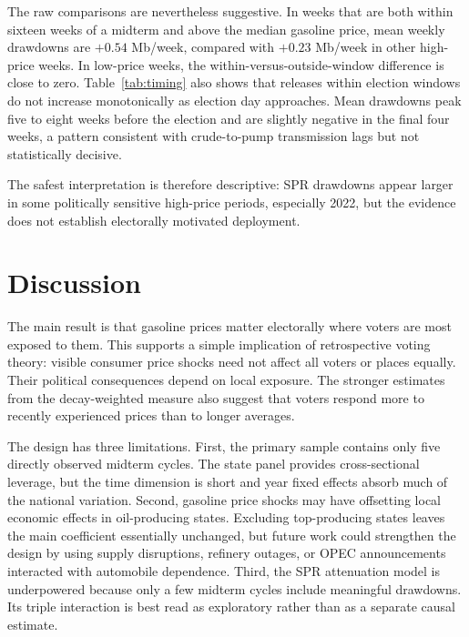 \documentclass[12pt]{article}
\begin{document}
The raw comparisons are nevertheless suggestive. In weeks that are both within sixteen weeks of a midterm and above the median gasoline price, mean weekly drawdowns are $+0.54$ Mb/week, compared with $+0.23$ Mb/week in other high-price weeks. In low-price weeks, the within-versus-outside-window difference is close to zero. Table~\ref{tab:timing} also shows that releases within election windows do not increase monotonically as election day approaches. Mean drawdowns peak five to eight weeks before the election and are slightly negative in the final four weeks, a pattern consistent with crude-to-pump transmission lags but not statistically decisive.

The safest interpretation is therefore descriptive: SPR drawdowns appear larger in some politically sensitive high-price periods, especially 2022, but the evidence does not establish electorally motivated deployment.

\section{Discussion}
\label{sec:discuss}

The main result is that gasoline prices matter electorally where voters are most exposed to them. This supports a simple implication of retrospective voting theory: visible consumer price shocks need not affect all voters or places equally. Their political consequences depend on local exposure. The stronger estimates from the decay-weighted measure also suggest that voters respond more to recently experienced prices than to longer averages.

The design has three limitations. First, the primary sample contains only five directly observed midterm cycles. The state panel provides cross-sectional leverage, but the time dimension is short and year fixed effects absorb much of the national variation. Second, gasoline price shocks may have offsetting local economic effects in oil-producing states. Excluding top-producing states leaves the main coefficient essentially unchanged, but future work could strengthen the design by using supply disruptions, refinery outages, or OPEC announcements interacted with automobile dependence. Third, the SPR attenuation model is underpowered because only a few midterm cycles include meaningful drawdowns. Its triple interaction is best read as exploratory rather than as a separate causal estimate.
\end{document}
